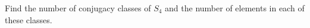 \documentclass[12pt,letterpaper,boxed]{hmcpset}
\begin{document}
\begin{solution}
\end{solution}

\clearpage

\begin{problem}[4.4.16]
Find the number of conjugacy classes of $S_4$ and the number of elements in each of these classes. 
\end{problem}

\begin{solution}

\end{solution}
\end{document}
